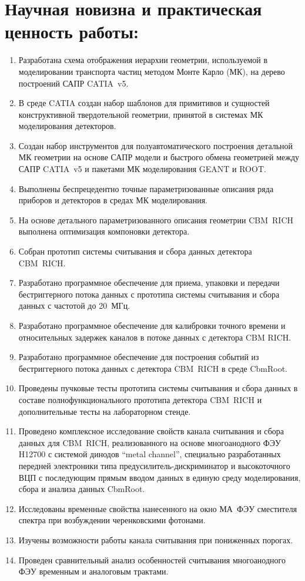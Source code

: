 \section*{Научная новизна и практическая ценность работы:}

\begin{enumerate}
\item Разработана схема отображения иерархии геометрии, используемой в моделировании транспорта частиц методом Монте Карло (МК), на дерево построений САПР CATIA~v5.
\item В среде CATIA создан набор шаблонов для примитивов и сущностей конструктивной твердотельной геометрии, принятой в системах МК моделирования детекторов.
\item Создан набор инструментов для полуавтоматического построения детальной МК геометрии на основе САПР модели и быстрого обмена геометрией между САПР CATIA~v5 и пакетами МК моделирования GEANT и ROOT.
\item Выполнены беспрецедентно точные параметризованные описания ряда приборов и детекторов в средах МК моделирования.
\item На основе детального параметризованного описания геометрии CBM~RICH выполнена оптимизация компоновки детектора. 
\item Собран прототип системы считывания и сбора данных детектора CBM~RICH.
\item Разработано программное обеспечение для приема, упаковки и передачи бестриггерного потока данных с прототипа системы считывания и сбора данных с частотой до 20~МГц.
\item Разработано программное обеспечение для калибровки точного времени и относительных задержек каналов в потоке данных с детектора CBM RICH.
\item Разработано программное обеспечение для построения событий из бестриггерного потока данных с детектора CBM~RICH в среде CbmRoot.
\item Проведены пучковые тесты прототипа системы считывания и сбора данных в составе полнофункционального прототипа детектора CBM~RICH и дополнительные тесты на лабораторном стенде. 
\item Проведено комплексное исследование свойств канала считывания и сбора данных для CBM~RICH, реализованного на основе многоанодного ФЭУ H12700 с системой динодов ``metal channel'', специально разработанных передней электроники типа предусилитель-дискриминатор и высокоточного ВЦП с последующим прямым вводом данных в единую среду моделирования, сбора и анализа данных CbmRoot.
\item Исследованы временные свойства нанесенного на окно МА~ФЭУ сместителя спектра при возбуждении черенковскими фотонами.
\item Изучены возможности работы канала считывания при пониженных порогах.
\item Проведен сравнительный анализ особенностей считывания многоанодного ФЭУ временным и аналоговым трактами.
\end{enumerate}
